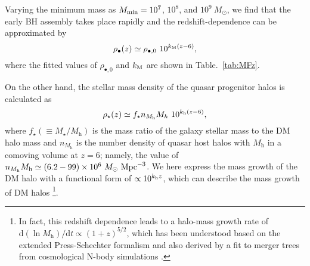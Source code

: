 \documentclass[twocolumn, twocolappendix]{aastex63}
\newcommand{\Msun}{M_\odot}
\newcommand{\Msunyr}{M_\odot~{\rm yr}^{-1}}
\newcommand{\Mh}{M_\mathrm{h}}
\newcommand{\D}{\mathrm{d}}
\begin{document}
\begin{CJK*}{UTF8}{gbsn}
Varying the minimum mass as $M_{\rm min}=10^7$, $10^8$, and $10^9~\Msun$,
we find that the early BH assembly takes place rapidly and the redshift-dependence can be approximated by
%
\begin{equation}
\rho_\bullet(z)
\simeq \rho_{\bullet,0}~ 10^{k_{\rm M}(z-6)},
\end{equation}
%
where the fitted values of $\rho_{\bullet,0}$ and $k_{\rm M}$ are shown in Table.~\ref{tab:MFz}.

On the other hand, the stellar mass density of the quasar progenitor halos is calculated as
%
\begin{equation}
\rho_{\star}(z)
\simeq f_\star n_{\Mh} M_h~ 10^{k_{\rm h}(z-6)},
\end{equation}
%
where $f_\star(\equiv M_\star/\Mh)$ is the mass ratio of the galaxy stellar mass to the DM halo mass and
$n_{\Mh}$ is the number density of quasar host halos with $\Mh$ in a comoving volume at $z=6$; namely,
the value of $n_{\Mh}\Mh \simeq (6.2-99)\times 10^6~\Msun~{\rm Mpc}^{-3}$.
We here express the mass growth of the DM halo with a functional form of $\propto 10^{k_{\rm h} z}$,
which can describe the mass growth of DM halos
\citep[e.g.,][]{2002ApJ...568...52W,2008MNRAS.383..615N,2008MNRAS.388.1792N,2010MNRAS.406.2267F}
\footnote[4]{
In fact, this redshift dependence leads to a halo-mass growth rate of $\D \left(\ln \Mh \right) / \D t \propto(1+z)^{5/2}$,
which has been understood based on the extended Press-Schechter formalism and also derived by
a fit to merger trees from cosmological N-body simulations \citep{2013MNRAS.435..999D}.}.



\end{CJK*}
\end{document}
